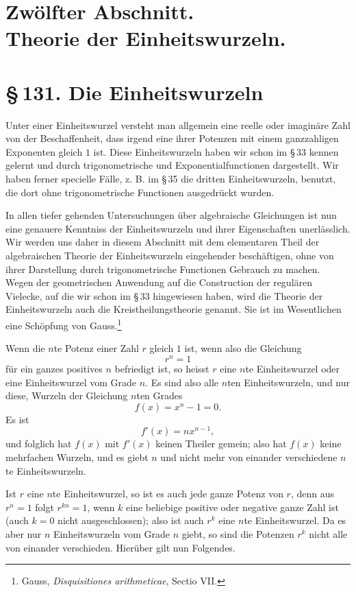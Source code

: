 \documentclass[11pt]{article}
\providecommand{\sect}[2]{\section*{\S\,#1. #2}}
\begin{document}
\section*{Zwölfter Abschnitt.\\Theorie der Einheitswurzeln.}

\sect{131}{Die Einheitswurzeln}

Unter einer Einheitswurzel versteht man allgemein eine reelle oder imaginäre Zahl von der Beschaffenheit, dass irgend eine ihrer Potenzen mit einem ganzzahligen Exponenten gleich $1$ ist. Diese Einheitswurzeln haben wir schon im \S\,33 kennen gelernt und durch trigonometrische und Exponentialfunctionen dargestellt. Wir haben ferner specielle Fälle, z. B. im \S\,35 die dritten Einheitswurzeln, benutzt, die dort ohne trigonometrische Functionen ausgedrückt wurden.

In allen tiefer gehenden Untersuchungen über algebraische Gleichungen ist nun eine genauere Kenntniss der Einheitswurzeln und ihrer Eigenschaften unerlässlich. Wir werden uns daher in diesem Abschnitt mit dem elementaren Theil der algebraischen Theorie der Einheitswurzeln eingehender beschäftigen, ohne von ihrer Darstellung durch trigonometrische Functionen Gebrauch zu machen. Wegen der geometrischen Anwendung auf die Construction der regulären Vielecke, auf die wir schon im \S\,33 hingewiesen haben, wird die Theorie der Einheitswurzeln auch die Kreistheilungstheorie genannt. Sie ist im Wesentlichen eine Schöpfung von Gauss.\footnote{Gauss, \emph{Disquisitiones arithmeticae}, Sectio VII.}

Wenn die $n$te Potenz einer Zahl $r$ gleich $1$ ist, wenn also die Gleichung
\[
\tag{1}        r^n=1
\]
für ein ganzes positives $n$ befriedigt ist, so heisst $r$ eine $n$te Einheitswurzel oder eine Einheitswurzel vom Grade $n$. Es sind also alle $n$ten Einheitswurzeln, und nur diese, Wurzeln der Gleichung $n$ten Grades
\[
\tag{2}        f(x)=x^n-1=0.
\]
Es ist
\[
\tag{3}        f'(x)=n x^{n-1},
\]
und folglich hat $f(x)$ mit $f'(x)$ keinen Theiler gemein; also hat $f(x)$ keine mehrfachen Wurzeln, und es giebt $n$ und nicht mehr von einander verschiedene $n$te Einheitswurzeln.

Ist $r$ eine $n$te Einheitswurzel, so ist es auch jede ganze Potenz von $r$, denn aus $r^n=1$ folgt $r^{kn}=1$, wenn $k$ eine beliebige positive oder negative ganze Zahl ist (auch $k=0$ nicht ausgeschlossen); also ist auch $r^k$ eine $n$te Einheitswurzel. Da es aber nur $n$ Einheitswurzeln vom Grade $n$ giebt, so sind die Potenzen $r^k$ nicht alle von einander verschieden. Hierüber gilt nun Folgendes.
\end{document}
